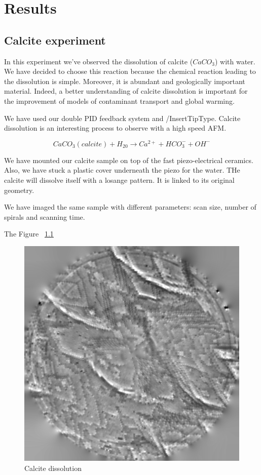 \chapter{Results}


\section{Calcite experiment}

In this experiment we've observed the dissolution of calcite ($CaCO_3$) with water. We have decided to choose this reaction because the chemical reaction leading to the dissolution is simple. Moreover, it is abundant and geologically important material.\cite{hillner1992atomic} Indeed, a better understanding of calcite dissolution is important for the improvement of models of contaminant transport and global warming. \cite{liang1996dissolution}



We have used our double PID feedback system and /InsertTipType. Calcite dissolution is an interesting process to observe with a high speed AFM. 

\begin{equation}\label{calcite}
CaCO_3(calcite) + H_20 \rightarrow Ca^{2+} + HCO_3^- + OH^- 
\end{equation}

We have mounted our calcite sample on top of the fast piezo-electrical ceramics. Also, we have stuck a plastic cover underneath the piezo for the water. THe calcite will dissolve itself with a losange pattern. It is linked to its original geometry.

We have imaged the same sample with different parameters: scan size, number of spirals and scanning time.

The Figure ~\ref{Calcite dissolution} 
\begin{figure}[H]
  \centering
  \includegraphics[scale=0.5]{images/006_X10s50l10m_MOv2_17.png}
    \caption{Calcite dissolution}
  \label{Calcite dissolution}
\end{figure}

